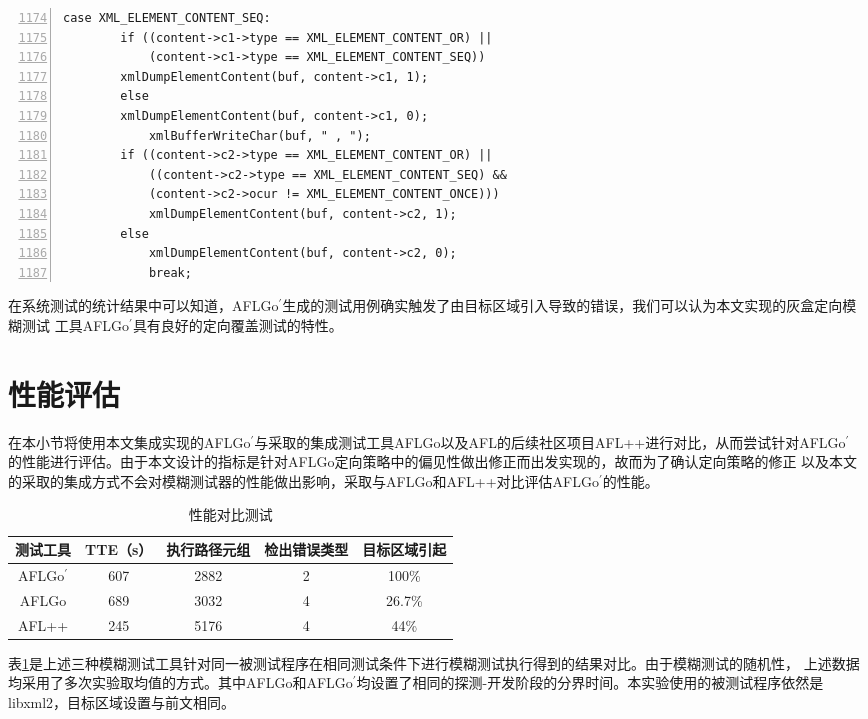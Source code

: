 \documentclass[bachelor]{njupthesis}
\begin{document}
\renewcommand{\thelstlisting}{5.\arabic{lstlisting}}
\begin{lstlisting}[caption={示例错误函数},label={code:bug},numbers=left,firstnumber=1174,numbersep=-2em,numberstyle=\footnotesize ]
	case XML_ELEMENT_CONTENT_SEQ:
		if ((content->c1->type == XML_ELEMENT_CONTENT_OR) ||
			(content->c1->type == XML_ELEMENT_CONTENT_SEQ))
		xmlDumpElementContent(buf, content->c1, 1);
		else
		xmlDumpElementContent(buf, content->c1, 0);
			xmlBufferWriteChar(buf, " , ");
		if ((content->c2->type == XML_ELEMENT_CONTENT_OR) ||
			((content->c2->type == XML_ELEMENT_CONTENT_SEQ) &&
			(content->c2->ocur != XML_ELEMENT_CONTENT_ONCE)))
			xmlDumpElementContent(buf, content->c2, 1);
		else
			xmlDumpElementContent(buf, content->c2, 0);
			break;
\end{lstlisting}

在系统测试的统计结果中可以知道，AFLGo$^\prime$生成的测试用例确实触发了由目标区域引入导致的错误，我们可以认为本文实现的灰盒定向模糊测试
工具AFLGo$^\prime$具有良好的定向覆盖测试的特性。
\section{性能评估}
在本小节将使用本文集成实现的AFLGo$^\prime$与采取的集成测试工具AFLGo以及AFL的后续社区项目AFL++进行对比，从而尝试针对AFLGo$^\prime$
的性能进行评估。由于本文设计的指标是针对AFLGo定向策略中的偏见性做出修正而出发实现的，故而为了确认定向策略的修正
以及本文的采取的集成方式不会对模糊测试器的性能做出影响，采取与AFLGo和AFL++对比评估AFLGo$^\prime$的性能。

\begin{table}[htbp]
	\centering
	\caption{性能对比测试}\label{tab:aflgot}
	\begin{tabular}{|c|c|c|c|c|}
	  \hline
	  测试工具 & TTE（s）&执行路径元组& 检出错误类型 &目标区域引起 \\
	  \hline
	  AFLGo$^\prime$ & 607 & 2882 & 2  & 100\% \\
	  \hline
	  AFLGo & 689 & 3032 & 4  & 26.7\%\\
	  \hline
	  AFL++ & 245 & 5176 & 4  & 44\%\\
	  \hline  
	\end{tabular}
\end{table}
\vspace{6pt}
表\ref{tab:aflgot}是上述三种模糊测试工具针对同一被测试程序在相同测试条件下进行模糊测试执行得到的结果对比。由于模糊测试的随机性，
上述数据均采用了多次实验取均值的方式。其中AFLGo和AFLGo$^\prime$均设置了相同的探测-开发阶段的分界时间。本实验使用的被测试程序依然是
libxml2，目标区域设置与前文相同。
\end{document}
